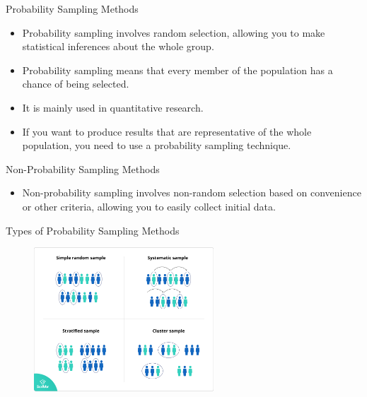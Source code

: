 \begin{frame}[t]{Probability Sampling Methods}
	\begin{itemize}
		\item Probability sampling involves 
		random selection, allowing you to make statistical inferences about the 
		whole group.
		\item Probability sampling means that every member of the population 
		has a chance of being selected.
		\item It is mainly used in quantitative research.
		\item If you want to produce results that are representative of the 
		whole population, you need to use a probability sampling technique.
	\end{itemize}
\end{frame}

\begin{frame}[t]{Non-Probability Sampling Methods}
	\begin{itemize}
		\item Non-probability sampling involves 
		non-random selection based on convenience or other criteria, allowing 
		you to easily collect initial data.
	\end{itemize}
\end{frame}

\begin{frame}[t]{Types of Probability Sampling Methods}
	\begin{figure} [ht]
		\centering
		\includegraphics[width=0.6\textwidth]{rp/sampling.png}
	\end{figure}
\end{frame}


